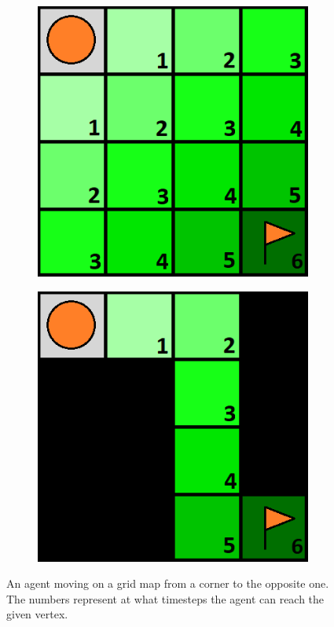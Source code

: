 \begin{figure}[ht]
\centering
\hspace{0.9cm}
\begin{subfigure}{0.27\columnwidth}
\centering
\includegraphics[width=\textwidth]{img/diagonal_agent.png}
\caption{}
\label{fig:diagonal}
\end{subfigure}
\hfill
\begin{subfigure}{0.27\columnwidth}
\centering
\includegraphics[width=\textwidth]{img/diagonal_single_path.png}
\caption{}
\label{fig:diagonal_path}
\end{subfigure}
\hspace{0.9cm}
\caption{An agent moving on a grid map from a corner to the opposite one. The numbers represent at what timesteps the agent can reach the given vertex.}
\label{fig:diagonal_example}
\end{figure}
